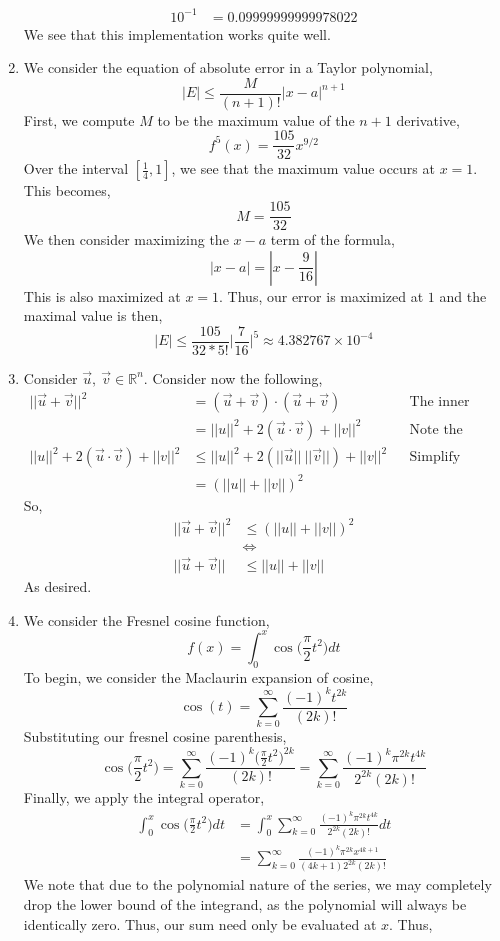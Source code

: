 \documentclass[letterpaper,10pt]{article}
\newcommand{\R}{\mathbb{R}}
\begin{document}
\begin{enumerate}
\begin{align*}
10^{-1} &= 0.09999999999978022
\end{align*}
We see that this implementation works quite well.
\item We consider the equation of absolute error in a Taylor polynomial,
\[|E|\leq \frac{M}{(n+1)!}|x-a|^{n+1}\]
First, we compute $M$ to be the maximum value of the $n+1$ derivative,
\[f^5(x)=\frac{105}{32}x^{9/2}\]
Over the interval $[\frac{1}{4},1]$, we see that the maximum value occurs at $x=1$. This becomes,
\[M=\frac{105}{32}\]
We then consider maximizing the $x-a$ term of the formula,
\[|x-a|=|x-\frac{9}{16}|\]
This is also maximized at $x=1$. Thus, our error is maximized at $1$ and the maximal value is then,
\[|E|\leq \frac{105}{32*5!}\bigg|\frac{7}{16}\bigg|^5\approx 4.382767\times10^{-4}\]
\item Consider $\vec{u},\ \vec{v}\in \R^n$. Consider now the following,
\begin{align*}
||\vec{u}+\vec{v}||^2 &= (\vec{u}+\vec{v})\cdot(\vec{u}+\vec{v}) && \text{The inner product}\\
&=||u||^2+2(\vec{u}\cdot \vec{v})+||v||^2 && \text{Note the Cauchy-Schwarz Inequality}\\
||u||^2+2(\vec{u}\cdot \vec{v})+||v||^2 &\leq ||u||^2+2(||\vec{u}||\ ||\vec{v}||)+||v||^2 && \text{Simplify}\\
&=(||u||+||v||)^2
\end{align*}
So,
\begin{align*}
||\vec{u}+\vec{v}||^2 &\leq (||u||+||v||)^2\\
&\Leftrightarrow\\
||\vec{u}+\vec{v}|| &\leq ||u||+||v||
\end{align*}
As desired.
\item We consider the Fresnel cosine function,
\[f(x)=\int_0^x\cos\big(\frac{\pi}{2}t^2\big)dt\]
To begin, we consider the Maclaurin expansion of cosine,
\[\cos(t)=\sum_{k=0}^{\infty}\frac{(-1)^kt^{2k}}{(2k)!}\]
Substituting our fresnel cosine parenthesis,
\[\cos\big(\frac{\pi}{2}t^2\big)=\sum_{k=0}^{\infty}\frac{(-1)^k\big(\frac{\pi}{2}t^2\big)^{2k}}{(2k)!}=\sum_{k=0}^{\infty}\frac{(-1)^k\pi^{2k}t^{4k}}{2^{2k}(2k)!}\]
Finally, we apply the integral operator,
\begin{align*}
\int_0^x\cos\big(\frac{\pi}{2}t^2\big)dt&=\int_0^x\sum_{k=0}^{\infty}\frac{(-1)^k\pi^{2k}t^{4k}}{2^{2k}(2k)!}dt\\
&=\sum_{k=0}^{\infty}\frac{(-1)^k\pi^{2k}x^{4k+1}}{(4k+1)2^{2k}(2k)!}
\end{align*}
We note that due to the polynomial nature of the series, we may completely drop the lower bound of the integrand, as the polynomial will always be identically zero. Thus, our sum need only be evaluated at $x$. Thus,

\end{enumerate}
\end{document}
